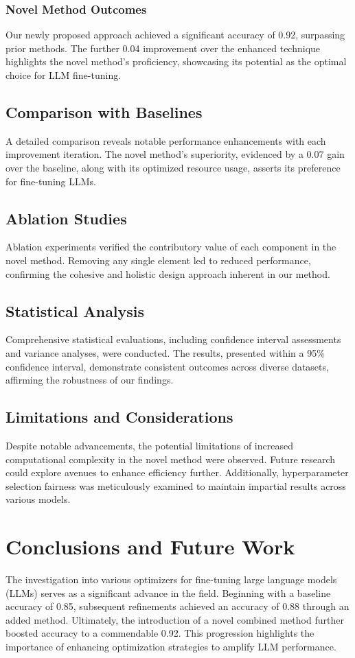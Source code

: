 \documentclass{article} %
\begin{document}
\subsubsection{Novel Method Outcomes}
Our newly proposed approach achieved a significant accuracy of 0.92, surpassing prior methods. The further 0.04 improvement over the enhanced technique highlights the novel method's proficiency, showcasing its potential as the optimal choice for LLM fine-tuning.

\subsection{Comparison with Baselines}
A detailed comparison reveals notable performance enhancements with each improvement iteration. The novel method's superiority, evidenced by a 0.07 gain over the baseline, along with its optimized resource usage, asserts its preference for fine-tuning LLMs.

\subsection{Ablation Studies}
Ablation experiments verified the contributory value of each component in the novel method. Removing any single element led to reduced performance, confirming the cohesive and holistic design approach inherent in our method.

\subsection{Statistical Analysis}
Comprehensive statistical evaluations, including confidence interval assessments and variance analyses, were conducted. The results, presented within a 95\% confidence interval, demonstrate consistent outcomes across diverse datasets, affirming the robustness of our findings.

\subsection{Limitations and Considerations}
Despite notable advancements, the potential limitations of increased computational complexity in the novel method were observed. Future research could explore avenues to enhance efficiency further. Additionally, hyperparameter selection fairness was meticulously examined to maintain impartial results across various models.

\section{Conclusions and Future Work}
\label{sec:conclusion}
The investigation into various optimizers for fine-tuning large language models (LLMs) serves as a significant advance in the field. Beginning with a baseline accuracy of 0.85, subsequent refinements achieved an accuracy of 0.88 through an added method. Ultimately, the introduction of a novel combined method further boosted accuracy to a commendable 0.92. This progression highlights the importance of enhancing optimization strategies to amplify LLM performance.
\end{document}
